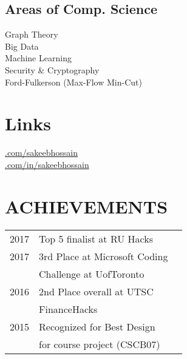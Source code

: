 \documentclass[]{deedy-resume-openfont}
\begin{document}
\begin{minipage}[t]{0.33\textwidth}
\subsection{Areas of Comp. Science}
Graph Theory \\
Big Data\\
Machine Learning \\
Security \& Cryptography \\
Ford-Fulkerson (Max-Flow Min-Cut)
\sectionsep


\section{Links} 
\href{https://github.com/sakeebhossain}{.com/sakeebhossain} \\
\href{https://www.linkedin.com/in/sakeebhossain}{.com/in/sakeebhossain} \\
\sectionsep


\section{ACHIEVEMENTS} 
\begin{tabular}{rll}
2017	     & Top 5 finalist at RU Hacks\\
2017	     & 3rd Place at Microsoft Coding\\
             & Challenge at UofToronto\\
2016	     & 2nd Place overall at UTSC\\ 
             & FinanceHacks\\
2015	     & Recognized for Best Design\\
             & for course project (CSCB07)\\

\end{tabular}
\sectionsep


%
%

\end{minipage} 
\hfill
\end{document}
